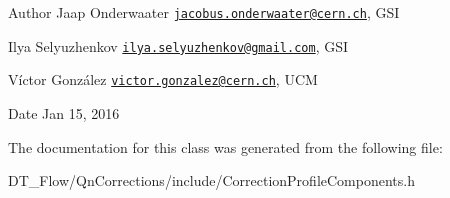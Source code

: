 \begin{DoxyAuthor}{Author}
Jaap Onderwaater \href{mailto:jacobus.onderwaater@cern.ch}{\tt jacobus.\+onderwaater@cern.\+ch}, G\+SI 

Ilya Selyuzhenkov \href{mailto:ilya.selyuzhenkov@gmail.com}{\tt ilya.\+selyuzhenkov@gmail.\+com}, G\+SI 

Víctor González \href{mailto:victor.gonzalez@cern.ch}{\tt victor.\+gonzalez@cern.\+ch}, U\+CM 
\end{DoxyAuthor}
\begin{DoxyDate}{Date}
Jan 15, 2016 
\end{DoxyDate}


The documentation for this class was generated from the following file\+:\begin{DoxyCompactItemize}
\item 
D\+T\+\_\+\+Flow/\+Qn\+Corrections/include/Correction\+Profile\+Components.\+h\end{DoxyCompactItemize}
